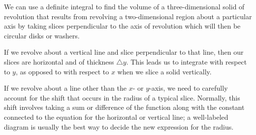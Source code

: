 \afterex




\begin{summary}
  \item We can use a definite integral to find the volume of a three-dimensional solid of revolution that results from revolving a two-dimensional region about a particular axis by taking slices perpendicular to the axis of revolution which will then be circular disks or washers.
  \item If we revolve about a vertical line and slice perpendicular to that line, then our slices are horizontal and of thickness $\triangle y$. This leads us to integrate with respect to $y$, as opposed to with respect to $x$ when we slice a solid vertically.
  \item If we revolve about a line other than the $x$- or $y$-axis, we need to carefully account for the shift that occurs in the radius of a typical slice.  Normally, this shift involves taking a sum or difference of the function along with the constant connected to the equation for the horizontal or vertical line; a well-labeled diagram is usually the best way to decide the new expression for the radius.
\end{summary}

\nin \hrulefill

 

\clearpage
